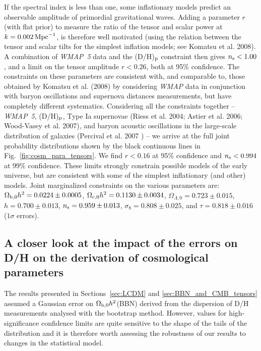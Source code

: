 \documentclass[useAMS,usenatbib]{mn2e}
\begin{document}
If the spectral index is less than one, some inflationary models predict an
observable amplitude of primordial gravitational waves. Adding a parameter
$r$ (with flat prior) to measure the ratio of the tensor and scalar power at
$k=0.002\,{\rm Mpc}^{-1}$, is therefore well motivated
(using the relation between
the tensor and scalar tilts for the simplest inflation
models; see Komatsu et al. 2008).
A combination of \textit{WMAP~5} data and the (D/H)$_{\rm p}$
constraint then gives $n_{\rm s} < 1.00$, and a limit on the tensor amplitude
$r < 0.26$, both at 95\% confidence.
The constraints on these parameters are
consistent with, and comparable to, those obtained by Komatsu et al. (2008)
by considering \textit{WMAP} data in conjunction with
baryon oscillations and supernova distances measurements,
but have completely different systematics.
Considering all the constraints together -- \textit{WMAP~5},
(D/H)$_{\rm p}$, Type Ia supernovae (Riess et al. 2004; Astier et al. 2006;
Wood-Vasey et al. 2007), and baryon acoustic oscillations in the large-scale
distribution of galaxies (Percival et al. 2007 ) -- we arrive at the full joint
probability distributions shown by the black continuous lines
in Fig.~\ref{fig:cosm_para_tensors}.
We find $r < 0.16$ at 95\% confidence and
$n_{\rm s} < 0.994$ at 99\% confidence.
These limits strongly constrain possible
models of the early universe, but are consistent with
some of the simplest
inflationary (and other) models. Joint marginalized constraints on the
various parameters are:
$\Omega_{\rm b,0}h^2 = 0.0224 \pm  0.0005$,
$\Omega_{\rm c, 0} h^2 = 0.1130 \pm 0.0034$,
$\Omega_{\Lambda, 0} = 0.723\pm 0.015$,
$h = 0.700\pm 0.013$,
$n_{\rm s} = 0.959 \pm 0.013$, $\sigma_8 = 0.808 \pm 0.025$,
and $\tau = 0.818 \pm 0.016$  ($1 \sigma$ errors).


\subsection{A closer look at the impact of the errors
on D/H on the derivation of cosmological parameters}

The results presented in 
Sections~\ref{sec:LCDM} and 
\ref{sec:BBN_and_CMB_tensors}
assumed a Gaussian error on 
$\Omega_{\rm b,0} h^2$(BBN) derived
from the dispersion of D/H measurements 
analysed with the bootstrap method.
However, values for high-significance confidence limits are 
quite sensitive to the shape of the tails of the distribution
and it is therefore
worth assessing the robustness of our results to changes 
in the statistical model. 
\end{document}
